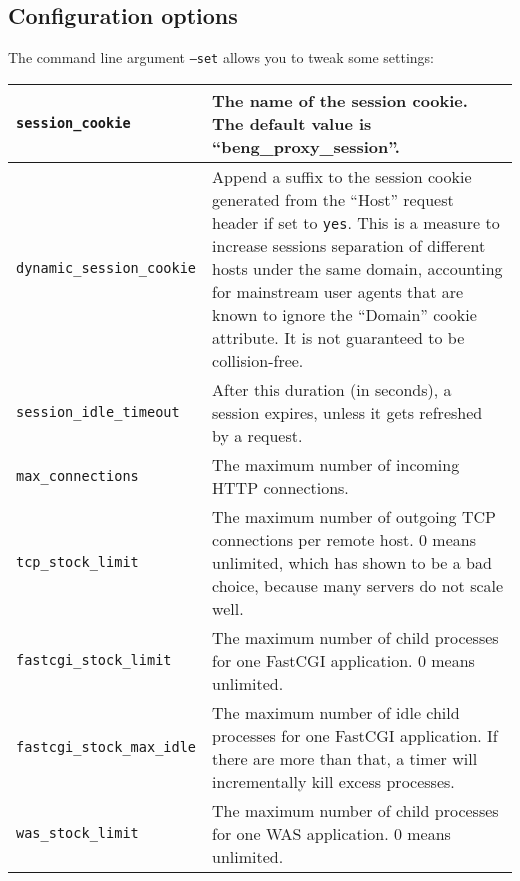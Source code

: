 \documentclass[a4paper,12pt]{article}
\begin{document}
\subsection{Configuration options}

The command line argument \texttt{--set} allows you to tweak some
settings:

\begin{longtable}{|l|p{8cm}|}
\hline

\verb|session_cookie| & The name of the session cookie.  The
default value is ``beng\_proxy\_session''. \\ \hline

\verb|dynamic_session_cookie| & Append a suffix to the session cookie
generated from the ``Host'' request header if set to \texttt{yes}.
This is a measure to increase sessions separation of different hosts
under the same domain, accounting for mainstream user agents that are
known to ignore the ``Domain'' cookie attribute.  It is not guaranteed
to be collision-free.  \\ \hline

\verb|session_idle_timeout| & After this duration (in seconds), a
session expires, unless it gets refreshed by a request. \\

\hline

\verb|max_connections| & The maximum number of incoming HTTP
connections. \\
\hline

\verb|tcp_stock_limit| & The maximum number of outgoing TCP
connections per remote host.  0 means unlimited, which has shown to be
a bad choice, because many servers do not scale well. \\

\hline

\verb|fastcgi_stock_limit| & The maximum number of child processes
for one FastCGI application.  0 means unlimited. \\

\hline

\verb|fastcgi_stock_max_idle| & The maximum number of idle child
processes for one FastCGI application.  If there are more than that, a
timer will incrementally kill excess processes. \\

\hline

\verb|was_stock_limit| & The maximum number of child processes for
one WAS application.  0 means unlimited. \\


\end{longtable}
\end{document}
